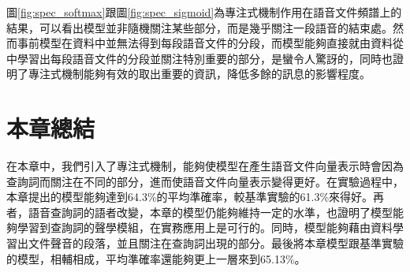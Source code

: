 \hspace{10cm}

圖\ref{fig:spec_softmax}跟圖\ref{fig:spec_sigmoid}為專注式機制作用在語音文件頻譜上的結果，可以看出模型並非隨機關注某些部分，而是幾乎關注一段語音的結束處。然而事前模型在資料中並無法得到每段語音文件的分段，而模型能夠直接就由資料從中學習出每段語音文件的分段並關注特別重要的部分，是蠻令人驚訝的，同時也證明了專注式機制能夠有效的取出重要的資訊，降低多餘的訊息的影響程度。

\section{本章總結}
在本章中，我們引入了專注式機制，能夠使模型在產生語音文件向量表示時會因為查詢詞而關注在不同的部分，進而使語音文件向量表示變得更好。在實驗過程中，本章提出的模型能夠達到64.3\%的平均準確率，較基準實驗的61.3\%來得好。再者，語音查詢詞的語者改變，本章的模型仍能夠維持一定的水準，也證明了模型能夠學習到查詢詞的聲學模組，在實務應用上是可行的。同時，模型能夠藉由資料學習出文件聲音的段落，並且關注在查詢詞出現的部分。最後將本章模型跟基準實驗的模型，相輔相成，平均準確率還能夠更上一層來到65.13\%。
